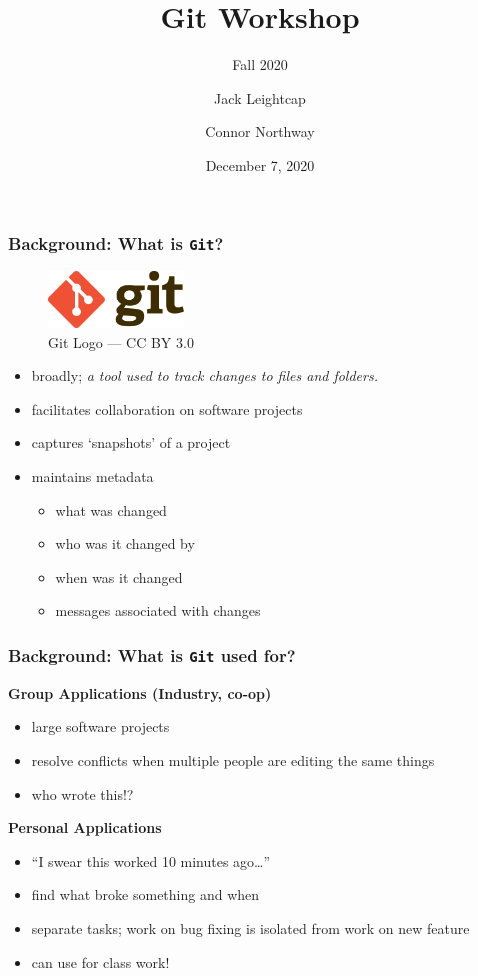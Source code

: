 \documentclass{beamer} \usetheme{Madrid}
\title{Git Workshop}
\subtitle{Fall 2020}
\author[]{Jack Leightcap\inst{1}\inst{2} \and Connor Northway\inst{2}}
\institute[IEEE, Wireless Club]{
    \inst{1}IEEE -- \url{nuieeeofficers@gmail.com}
    \and
    \inst{2}Wireless Club -- \url{nuwirelessclub@gmail.com}
}
\date[Fall 2020]{December 7, 2020}
\begin{document}
\frame{\titlepage}

\begin{frame}
    \frametitle{Background: What is \texttt{Git}?}
    \vfill
    \begin{figure}
        \includegraphics[height=15mm]{logo.png}
        \caption{Git Logo --- CC BY 3.0}
    \end{figure}
    \vfill
    \begin{itemize}
        \item broadly; \emph{a tool used to track changes to files and folders.}
        \item facilitates collaboration on software projects
        \item captures `snapshots' of a project
        \item maintains metadata
        \begin{itemize}
            \item what was changed
            \item who was it changed by
            \item when was it changed
            \item messages associated with changes
        \end{itemize}
    \end{itemize}
    \vfill
\end{frame}

\begin{frame}
    \frametitle{Background: What is \texttt{Git} used for?}
    \vfill
    \centering \textbf{Group Applications (Industry, co-op)}
    \begin{itemize}
        \item large software projects
        \item resolve conflicts when multiple people are editing the same things
        \item who wrote this!?
    \end{itemize}
    \vfill
    \centering \textbf{Personal Applications}
    \begin{itemize}
        \item ``I swear this worked 10 minutes ago\ldots''
        \item find what broke something and when
        \item separate tasks; work on bug fixing is isolated from work on new feature
        \item can use for class work!
    \end{itemize}
    \vfill
\end{frame}
\end{document}
